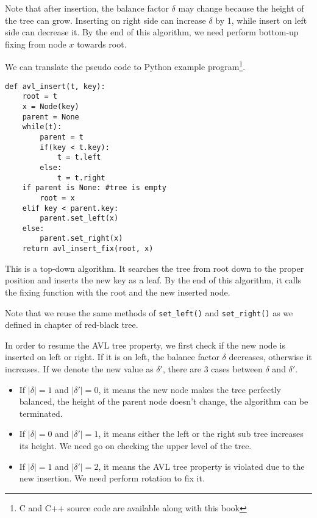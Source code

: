 \documentclass[b5paper]{article}
\begin{document}
Note that after insertion, the balance factor $\delta$ may change because
the height of the tree can grow. Inserting on right side can
increase $\delta$ by 1, while insert on left side can decrease it. By
the end of this algorithm, we need perform bottom-up fixing from node $x$
towards root.

We can translate the pseudo code to Python example program\footnote{C and C++ source code are available along with this book}.
\lstset{language=Python}
\begin{lstlisting}
def avl_insert(t, key):
    root = t
    x = Node(key)
    parent = None
    while(t):
        parent = t
        if(key < t.key):
            t = t.left
        else:
            t = t.right
    if parent is None: #tree is empty
        root = x
    elif key < parent.key:
        parent.set_left(x)
    else:
        parent.set_right(x)
    return avl_insert_fix(root, x)
\end{lstlisting}

This is a top-down algorithm. It searches the tree from root down to the proper
position and inserts the new key as a leaf. By the end of this algorithm, it calls the fixing function with the root and the new inserted node.

Note that we reuse the same methods of \texttt{set\_left()} and \texttt{set\_right()} as
we defined in chapter of red-black tree.

In order to resume the AVL tree property, we first check if the new node is inserted on left or right. If it is on left, the balance factor $\delta$ decreases, otherwise it increases. If we denote the new value as $\delta'$, there are 3 cases between $\delta$ and $\delta'$.

\begin{itemize}
\item If $|\delta| = 1$ and $|\delta'| = 0$, it means the new node makes the tree perfectly balanced, the height of the parent node doesn't change, the algorithm can be terminated.

\item If $|\delta| = 0$ and $|\delta'| = 1$, it means either the left or the right sub tree increases its height. We need go on checking the upper level of the tree.

\item If $|\delta| = 1$ and $|\delta'| = 2$, it means the AVL tree property is violated due to the new insertion. We need perform rotation to fix it.
\end{itemize}
\end{document}
